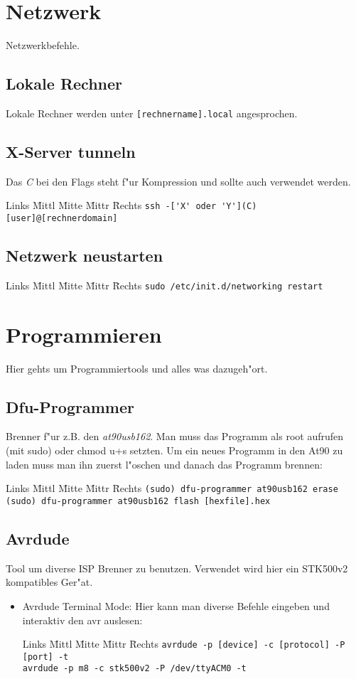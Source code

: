 \documentclass[12pt]{article}
\newenvironment{code}{\begin{tabbing}Links \= Mittl \= Mitte \= Mittr \= Rechts \kill}{\end{tabbing}}
\begin{document}
\section{Netzwerk}
Netzwerkbefehle.
\subsection{Lokale Rechner}
Lokale Rechner werden unter \verb#[rechnername].local# angesprochen.
\subsection{X-Server tunneln}
Das \textit{C} bei den Flags steht f"ur Kompression und sollte auch verwendet werden.
\begin{code}
	\> \verb#ssh -['X' oder 'Y'](C) [user]@[rechnerdomain]#
\end{code}
\subsection{Netzwerk neustarten}
\begin{code}
	\> \verb#sudo /etc/init.d/networking restart#
\end{code}

\section{Programmieren}
Hier gehts um Programmiertools und alles was dazugeh"ort.
\subsection{Dfu-Programmer}
Brenner f"ur z.B. den \textit{at90usb162}. Man muss das Programm als root aufrufen (mit sudo) oder
chmod u+s setzten.
Um ein neues Programm in den At90 zu laden muss man ihn zuerst l"oschen und danach das Programm brennen:
\begin{code}
	\> \verb#(sudo) dfu-programmer at90usb162 erase# \\
	\> \verb#(sudo) dfu-programmer at90usb162 flash [hexfile].hex#	
\end{code}
\subsection{Avrdude}
Tool um diverse ISP Brenner zu benutzen. Verwendet wird hier ein STK500v2 kompatibles Ger"at.
\begin{itemize}
	\item Avrdude Terminal Mode: Hier kann man diverse Befehle eingeben und interaktiv den avr auslesen:
	\begin{code}
		\> \verb#avrdude -p [device] -c [protocol] -P [port] -t# \\
		\> \verb#avrdude -p m8 -c stk500v2 -P /dev/ttyACM0 -t#
	\end{code}
\end{itemize}
\end{document}
